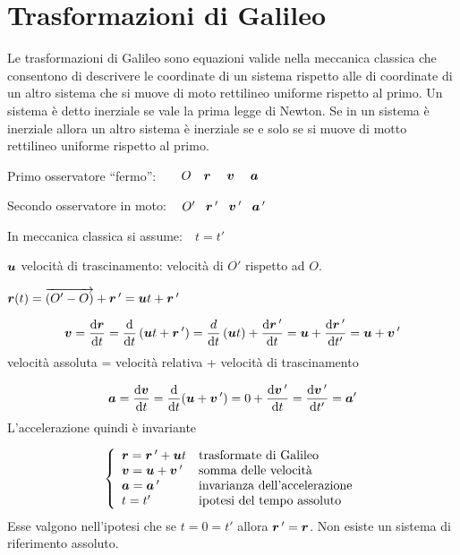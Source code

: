 \section{Trasformazioni di Galileo}
Le trasformazioni di Galileo sono equazioni valide nella meccanica classica che consentono di descrivere le coordinate di un sistema rispetto alle di coordinate di un altro sistema che si muove di moto rettilineo uniforme rispetto al primo. Un sistema è detto inerziale se vale la prima legge di Newton. Se in un sistema è inerziale allora un altro sistema è inerziale se e solo se si muove di motto rettilineo uniforme rispetto al primo.
\newline

Primo osservatore ``fermo'':$\qquad O\quad\boldsymbol{r}\quad\;\boldsymbol{v}\quad\;\boldsymbol{a}$

Secondo osservatore in moto:$\:\quad O'\quad\!\boldsymbol{r}\,'\quad\!\boldsymbol{v}\,'\quad\!\boldsymbol{a}\,'$

In meccanica classica si assume:$\quad t=t'$

$\boldsymbol{u}$ velocità di trascinamento: velocità di $O'$ rispetto ad $O$.
\begin{legge}
$\boldsymbol{r}(t)=\overrightarrow{\left(O'-O\right)}+\boldsymbol{r}\,'=\boldsymbol{u}
t+\boldsymbol{r}\,'$
\end{legge}
\begin{legge}
$$\boldsymbol{v}=\frac{\mathrm{d}\boldsymbol{r}}{\mathrm{d} t}=\frac{\mathrm{d}}{\mathrm{d} t}\left(\boldsymbol{u}
t+\boldsymbol{r}\,'\right)=\frac{d}{\mathrm{d} t}\left(\boldsymbol{u}
t\right)+\frac{\mathrm{d}\boldsymbol{r}\,'}{\mathrm{d} t}=\boldsymbol{u}+\frac{\mathrm{d}\boldsymbol{r}\,'}{\mathrm{d}
t'}=\boldsymbol{u}+\boldsymbol{v}\,'$$
velocità assoluta = velocità relativa + velocità di trascinamento
\end{legge}
\begin{legge}
$$\boldsymbol{a}=\frac{\mathrm{d} \boldsymbol{v}}{\mathrm{d} t}=\frac{\mathrm{d}}{\mathrm{d} t}(\boldsymbol{u}+\boldsymbol{v}\,')=0+\frac{\mathrm{d} \boldsymbol{v}\,'}{\mathrm{d} t}=\frac{\mathrm{d} \boldsymbol{v}\,'}{\mathrm{d}
t'}=\boldsymbol{a}'$$
L'accelerazione quindi è invariante
\end{legge}
$$\left\{\begin{array}{ll}
\boldsymbol{r}=\boldsymbol{r}\,'+\boldsymbol{u} t&\text{trasformate di Galileo}\\
\boldsymbol{v}=\boldsymbol{u}+\boldsymbol{v}\,'&\text{somma delle velocità}\\
\boldsymbol{a}=\boldsymbol{a}\,'&\text{invarianza dell'accelerazione}\\
t=t'&\text{ipotesi del tempo assoluto}\\
\end{array}\right.$$
Esse valgono nell'ipotesi che se $t=0=t'$ allora $\boldsymbol{r}\,'=\boldsymbol{r}$.
Non esiste un sistema di riferimento assoluto.
